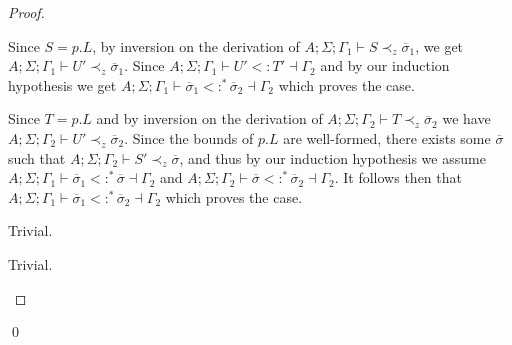 \documentclass{llncs}
\numberwithin{subsubcase}{subcase}
\numberwithin{subcase}{casethm}
\numberwithin{casethm}{theorem}
\numberwithin{casethm}{lemma}
\begin{document}
\begin{proof}
\begin{casethm}
\end{casethm}
\begin{casethm}
Since $S = p.L$, by inversion on the derivation of 
$A; \Sigma; \Gamma_1 \vdash S \prec_z \overline{\sigma}_1$, 
we get $A; \Sigma; \Gamma_1 \vdash U' \prec_z \overline{\sigma}_1$.
Since $A; \Sigma; \Gamma_1 \vdash U' <: T' \dashv \Gamma_2$ 
and by our induction hypothesis we get 
$A; \Sigma; \Gamma_1 \vdash \overline{\sigma}_1 <:^* \overline{\sigma}_2 \dashv \Gamma_2$ 
which proves the case.
\end{casethm}
\begin{casethm}
Since $T = p.L$ and by inversion on the derivation of 
$A; \Sigma; \Gamma_2 \vdash T \prec_z \overline{\sigma}_2$ 
we have $A; \Sigma; \Gamma_2 \vdash U' \prec_z \overline{\sigma}_2$.
Since the bounds of $p.L$ are well-formed, there exists 
some $\overline{\sigma}$ such that 
$A; \Sigma; \Gamma_2 \vdash S' \prec_z \overline{\sigma}$, and 
thus by our induction hypothesis we assume 
$A; \Sigma; \Gamma_1 \vdash \overline{\sigma}_1 <:^* \overline{\sigma} \dashv \Gamma_2$ and 
$A; \Sigma; \Gamma_2 \vdash \overline{\sigma} <:^* \overline{\sigma}_2 \dashv \Gamma_2$. 
It follows then that 
$A; \Sigma; \Gamma_1 \vdash \overline{\sigma}_1 <:^* \overline{\sigma}_2 \dashv \Gamma_2$ 
which proves the case.
\end{casethm}
\begin{casethm}
Trivial.
\end{casethm}
\begin{casethm}
Trivial.
\end{casethm}
\end{proof}
\qed
\end{document}

